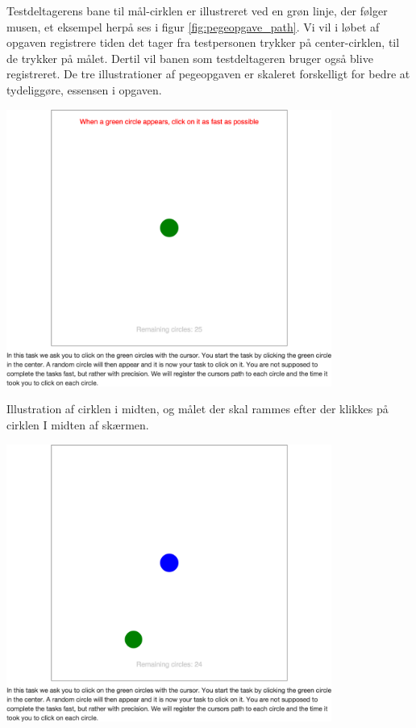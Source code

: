Testdeltagerens bane til mål-cirklen er illustreret ved en grøn linje, der følger musen, et eksempel herpå ses i figur \ref{fig:pegeopgave_path}. Vi vil i løbet af opgaven registrere tiden det tager fra testpersonen trykker på center-cirklen, til de trykker på målet. Dertil vil banen som testdeltageren bruger også blive registreret. De tre illustrationer af pegeopgaven er skaleret forskelligt for bedre at tydeliggøre, essensen i opgaven.

\begin{minipage}[t]{.5\linewidth}
\centering
\vspace{0pt}
\includegraphics[width=0.8\textwidth, trim = 8cm 20cm 8cm 15cm, clip]{images/screenshots/ex_step_6_pointing_start}
\label{fig:pegeopgave_start}
\caption{Illustration af cirklen i midten, og målet der skal rammes efter der klikkes på cirklen I midten af skærmen.}
\includegraphics[width=0.8\textwidth, trim = 8cm 8cm 8cm 15cm, clip]{images/screenshots/ex_step_6_pointing_target_1}

\end{minipage}
